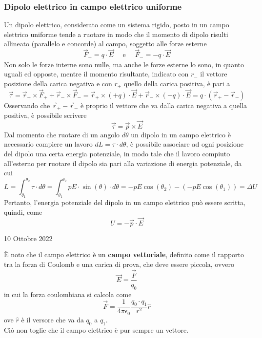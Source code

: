 \documentclass[a4paper]{extarticle}
\begin{document}
\subsubsection{Dipolo elettrico in campo elettrico uniforme}
Un dipolo elettrico, considerato come un sistema rigido, posto in un campo elettrico uniforme tende a ruotare in modo che il momento di dipolo risulti allineato (parallelo e concorde) al campo, soggetto alle forze esterne
\[\vec{F}_+ = q \cdot \vec E \hspace{1em} \text{ e } \hspace{1em} \vec{F}_- = -q \cdot \vec E\]
Non solo le forze interne sono nulle, ma anche le forze esterne lo sono, in quanto uguali ed opposte, mentre il momento risultante, indicato con $r_-$ il vettore posizione della carica negativa e con $r_+$ quello della carica positiva, è pari a
\[\vec \tau = \vec{r}_+ \times \vec{F}_+ + \vec{r}_- \times \vec{F}_- = \vec{r}_+ \times (+q) \cdot \vec {E} + \vec{r}_- \times (-q) \cdot \vec E = q \cdot (\vec{r}_+ - \vec{r}_-)\]
Osservando che $\vec{r}_+-\vec{r}_-$ è proprio il vettore che va dalla carica negativa a quella positiva, è possibile scrivere
\[\boxed{\vec \tau = \vec{p} \times \vec{E}}\]
Dal momento che ruotare di un angolo $d \theta$ un dipolo in un campo elettrico è necessario compiere un lavoro $dL = \tau \cdot d \theta$, è possibile associare ad ogni posizione del dipolo una certa energia potenziale, in modo tale che il lavoro compiuto all'esterno per ruotare il dipolo sia pari alla variazione di energia potenziale, da cui
\[L = \int_{\theta_1}^{\theta_2} \tau \cdot d\theta = \int_{\theta_1}^{\theta_2} pE \cdot \sin(\theta) \cdot d\theta = - p E \cos(\theta_2) - (- p E \cos(\theta_1)) = \Delta U\]
Pertanto, l'energia potenziale del dipolo in un campo elettrico può essere scritta, quindi, come
\[\boxed{U = - \vec{p} \cdot \vec{E}}\]

\noindent
\begin{center}
  10 Ottobre 2022
\end{center}
È noto che il campo elettrico è un \textbf{campo vettoriale}, definito come il rapporto tra la forza di Coulomb e una carica di prova, che deve essere piccola, ovvero
\[\vec E = \frac{\vec F}{q_0}\]
in cui la forza coulombiana si calcola come
\[\vec F = \frac{1}{4 \pi \epsilon_0} \frac{q_0 \cdot q_1}{r^2} \hat{r}\]
ove $\hat{r}$ è il versore che va da $q_0$ a $q_1$.\\
Ciò non toglie che il campo elettrico è pur sempre un vettore.

\vspace{1em}
\end{document}
